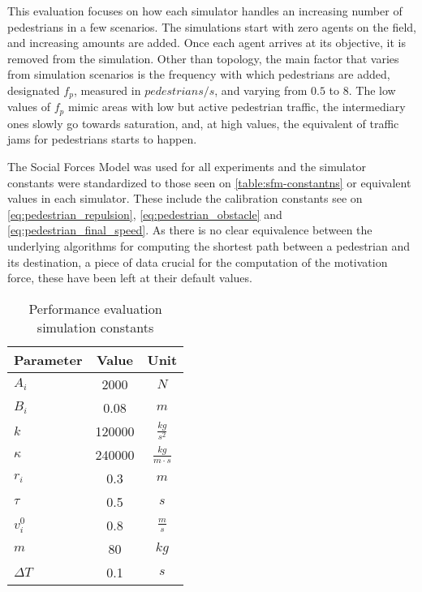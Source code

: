 \documentclass[twoside, 11pt]{article}
\begin{document}
This evaluation focuses on how each simulator handles an increasing number of pedestrians in a few scenarios. The simulations start with zero agents on the field, and increasing amounts are added. Once each agent arrives at its objective, it is removed from the simulation. Other than topology, the main factor that varies from simulation scenarios is the frequency with which pedestrians are added, designated $f_p$, measured in $pedestrians/s$, and varying from $0.5$ to $8$. The low values of $f_p$ mimic areas with low but active pedestrian traffic, the intermediary ones slowly go towards saturation, and, at high values, the equivalent of traffic jams for pedestrians starts to happen.

The Social Forces Model was used for all experiments and the simulator constants were standardized to those seen on \autoref{table:sfm-constantns} or equivalent values in each simulator. These include the calibration constants see on \autoref{eq:pedestrian_repulsion}, \autoref{eq:pedestrian_obstacle} and \autoref{eq:pedestrian_final_speed}. As there is no clear equivalence between the underlying algorithms for computing the shortest path between a pedestrian and its destination, a piece of data crucial for the computation of the motivation force, these have been left at their default values.

\begin{table}[h]
  \begin{center}
    \begin{tabular}{ | l | c | c | } 
      \hline
      Parameter & Value & Unit\\ 
      \hline 
      $A_i$ & 2000 & $N$\\
      \hline
      $B_i$ & 0.08 & $m$\\
      \hline
      $k$ & 120000 & $\frac{kg}{s^2}$\\
      \hline
      $\kappa$ & 240000 & $\frac{kg}{m \cdot s}$\\
      \hline
      $r_i$ & 0.3 & $m$\\
      \hline
      $\tau$ & 0.5 & $s$\\
      \hline
      $v_i^0$ & 0.8 & $\frac{m}{s}$\\
      \hline
      $m$ & 80 & $kg$\\
      \hline
      $\Delta T$ & 0.1 & $s$\\
      \hline 
    \end{tabular}
    \caption{Performance evaluation simulation constants}
    \label{table:sfm-constantns}
  \end{center}
\end{table}
\end{document}
